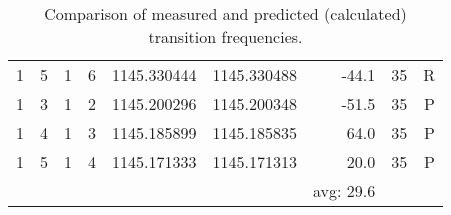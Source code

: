 \begin{table}
\begin{tabu}{rrrrrrrrr}
\rowfont{\color{red}}1 & 5 & 1 & 6 & 1145.330444 & 1145.330488 & -44.1 & 35 & R\\
\rowfont{\color{blue}}1 & 3 & 1 & 2 & 1145.200296 & 1145.200348 & -51.5 & 35 & P\\
\rowfont{\color{blue}}1 & 4 & 1 & 3 & 1145.185899 & 1145.185835 & 64.0 & 35 & P\\
\rowfont{\color{blue}}1 & 5 & 1 & 4 & 1145.171333 & 1145.171313 & 20.0 & 35 & P\\
\midrule
 &  &  &  &  &  &  avg: 29.6\\
\bottomrule
\end{tabu}\caption{Comparison of measured and predicted (calculated) transition frequencies.}\end{table}
